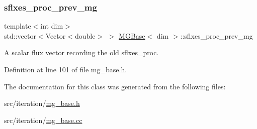 \subsubsection{\texorpdfstring{sflxes\+\_\+proc\+\_\+prev\+\_\+mg}{sflxes\_proc\_prev\_mg}}
{\footnotesize\ttfamily template$<$int dim$>$ \\
std\+::vector$<$Vector$<$double$>$ $>$ \hyperlink{class_m_g_base}{M\+G\+Base}$<$ dim $>$\+::sflxes\+\_\+proc\+\_\+prev\+\_\+mg\hspace{0.3cm}{\ttfamily [protected]}}



A scalar flux vector recording the old sflxes\+\_\+proc. 



Definition at line 101 of file mg\+\_\+base.\+h.



The documentation for this class was generated from the following files\+:\begin{DoxyCompactItemize}
\item 
src/iteration/\hyperlink{mg__base_8h}{mg\+\_\+base.\+h}\item 
src/iteration/\hyperlink{mg__base_8cc}{mg\+\_\+base.\+cc}\end{DoxyCompactItemize}
